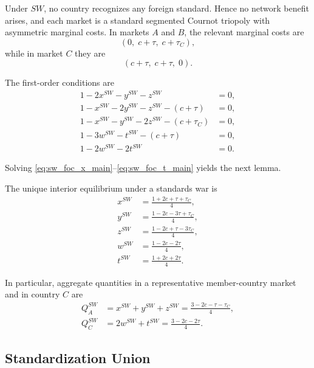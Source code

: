 Under $SW$, no country recognizes any foreign standard. Hence no network benefit arises, and each market is a standard segmented Cournot triopoly with asymmetric marginal costs. In markets $A$ and $B$, the relevant marginal costs are
\[
(0,\; c+\tau,\; c+\tau_C),
\]
while in market $C$ they are
\[
(c+\tau,\; c+\tau,\; 0).
\]

The first-order conditions are
\begin{align}
1-2x^{SW}-y^{SW}-z^{SW} &=0, \label{eq:sw_foc_x_main}\\
1-x^{SW}-2y^{SW}-z^{SW}-(c+\tau) &=0, \label{eq:sw_foc_y_main}\\
1-x^{SW}-y^{SW}-2z^{SW}-(c+\tau_C) &=0, \label{eq:sw_foc_z_main}\\
1-3w^{SW}-t^{SW}-(c+\tau) &=0, \label{eq:sw_foc_w_main}\\
1-2w^{SW}-2t^{SW} &=0. \label{eq:sw_foc_t_main}
\end{align}

Solving \eqref{eq:sw_foc_x_main}--\eqref{eq:sw_foc_t_main} yields the next lemma.

\begin{lemma}
The unique interior equilibrium under a standards war is
\begin{align}
x^{SW} &= \frac{1+2c+\tau+\tau_C}{4}, \label{eq:xsw_main}\\
y^{SW} &= \frac{1-2c-3\tau+\tau_C}{4}, \label{eq:ysw_main}\\
z^{SW} &= \frac{1-2c+\tau-3\tau_C}{4}, \label{eq:zsw_main}\\
w^{SW} &= \frac{1-2c-2\tau}{4}, \label{eq:wsw_main}\\
t^{SW} &= \frac{1+2c+2\tau}{4}. \label{eq:tsw_main}
\end{align}
\end{lemma}

\noindent
In particular, aggregate quantities in a representative member-country market and in country $C$ are
\begin{align}
Q_A^{SW} &= x^{SW}+y^{SW}+z^{SW}
= \frac{3-2c-\tau-\tau_C}{4}, \label{eq:QAsw_main}\\
Q_C^{SW} &= 2w^{SW}+t^{SW}
= \frac{3-2c-2\tau}{4}. \label{eq:QCsw_main}
\end{align}

\subsection{Standardization Union}

